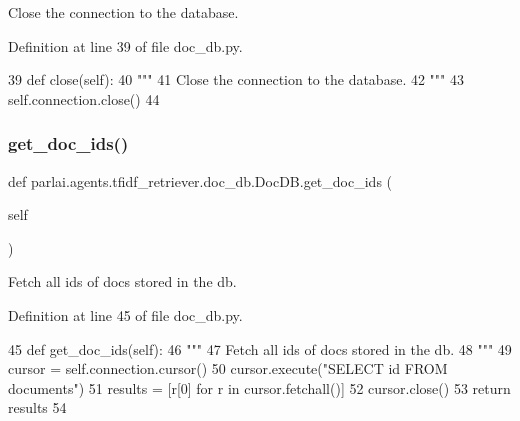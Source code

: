 \begin{DoxyVerb}Close the connection to the database.
\end{DoxyVerb}
 

Definition at line 39 of file doc\+\_\+db.\+py.


\begin{DoxyCode}
39     \textcolor{keyword}{def }close(self):
40         \textcolor{stringliteral}{"""}
41 \textcolor{stringliteral}{        Close the connection to the database.}
42 \textcolor{stringliteral}{        """}
43         self.connection.close()
44 
\end{DoxyCode}
\mbox{\label{classparlai_1_1agents_1_1tfidf__retriever_1_1doc__db_1_1DocDB_adc970ff10e2070e93cc22f95ad03f8f1}} 
\subsubsection{\texorpdfstring{get\+\_\+doc\+\_\+ids()}{get\_doc\_ids()}}
{\footnotesize\ttfamily def parlai.\+agents.\+tfidf\+\_\+retriever.\+doc\+\_\+db.\+Doc\+D\+B.\+get\+\_\+doc\+\_\+ids (\begin{DoxyParamCaption}\item[{}]{self }\end{DoxyParamCaption})}

\begin{DoxyVerb}Fetch all ids of docs stored in the db.
\end{DoxyVerb}
 

Definition at line 45 of file doc\+\_\+db.\+py.


\begin{DoxyCode}
45     \textcolor{keyword}{def }get\_doc\_ids(self):
46         \textcolor{stringliteral}{"""}
47 \textcolor{stringliteral}{        Fetch all ids of docs stored in the db.}
48 \textcolor{stringliteral}{        """}
49         cursor = self.connection.cursor()
50         cursor.execute(\textcolor{stringliteral}{"SELECT id FROM documents"})
51         results = [r[0] \textcolor{keywordflow}{for} r \textcolor{keywordflow}{in} cursor.fetchall()]
52         cursor.close()
53         \textcolor{keywordflow}{return} results
54 
\end{DoxyCode}
\mbox{\label{classparlai_1_1agents_1_1tfidf__retriever_1_1doc__db_1_1DocDB_a47aa0c10aa3f9693b2aa460953344d7e}} 
